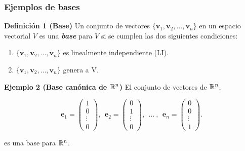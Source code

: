 {\nologo
\begin{frame}\frametitle{Ejemplos de bases}

\begin{block}{\textbf{Definición 1 (Base)}}
	\justifying
	Un conjunto de vectores $\{\mathbf{v}_1, \mathbf{v}_2, \hdots , \mathbf{v}_n \}$ en un espacio vectorial $V$ es 
	una \textbf{\textit{base}} para $V$ si se cumplen las dos siguientes condiciones:
	\begin{enumerate}
		\item[\labelname{$a$}] $\{\mathbf{v}_1, \mathbf{v}_2, \hdots , \mathbf{v}_n \}$ es linealmente independiente (LI).
		\item[\labelname{$b$}] $\{\mathbf{v}_1, \mathbf{v}_2, \hdots , \mathbf{v}_n \}$ genera a V.
	\end{enumerate}
\end{block}


\begin{ej}{\textbf{Ejemplo 2 (Base canónica de $\mathbb{R}^n$)}} \justifying
	El conjunto de vectores de $\mathbb{R}^n$,
	
	\vspace{-2mm}
	\[
	\mathbf{e}_1 =
	\left(
	\begin{array}{c}
	1\\
	0\\
	\vdots \\[1mm]
	0
	\end{array}
	\right),\ \ 
	\mathbf{e}_2 =
	\left(
	\begin{array}{c}
	0\\
	1\\
	\vdots \\[1mm]
	0
	\end{array}
	\right), \ \ 
	\hdots \ , \ \
	\mathbf{e}_n =
	\left(
	\begin{array}{c}
	0\\
	0\\
	\vdots \\[1mm]
	1
	\end{array}
	\right).
	\]
	
	\vspace{-0mm}
	es una base para $\mathbb{R}^n$.
\end{ej}	

\end{frame}
}


